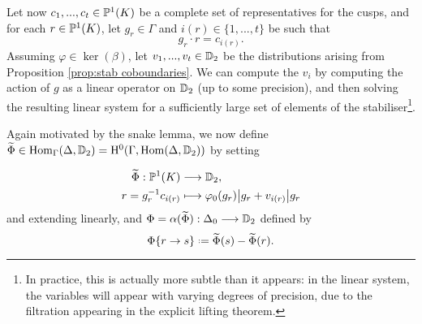 \documentclass[a4paper,11pt]{article}
\numberwithin{equation}{section}
\begin{document}
Let now $c_1, ..., c_t \in \mathbb{P}^1(K)$ be a complete set of representatives for the cusps, and for each $r \in \mathbb{P}^1(K)$, let $g_r \in \Gamma$ and $i(r) \in \{1,...,t\}$ be such that
\[
	g_r \cdot r = c_{i(r)}.
\]
Assuming $\varphi \in \ker(\beta)$, let $v_1, ..., v_t \in \mathbb{D}_2$ be the distributions arising from Proposition \ref{prop:stab coboundaries}. We can compute the $v_i$ by computing the action of $g$ as a linear operator on $\mathbb{D}_2$ (up to some precision), and then solving the resulting linear system for a sufficiently large set of elements of the stabiliser\footnote{In practice, this is actually more subtle than it appears: in the linear system, the variables will appear with varying degrees of precision, due to the filtration appearing in the explicit lifting theorem.}.

Again motivated by the snake lemma, we now define $\widetilde{\Phi} \in \mathrm{Hom}_\Gamma(\Delta,\mathbb{D}_2) = \mathrm{H}^0(\Gamma,\mathrm{Hom}(\Delta,\mathbb{D}_2))$ by setting

	\begin{align*}
		\widetilde{\Phi} : \mathbb{P}^1(K) &\longrightarrow \mathbb{D}_2,\\
				r = g_r^{-1}c_{i(r)} &\longmapsto \varphi_0(g_r)\big|g_r + v_{i(r)}\big|g_r
	\end{align*}
	and extending linearly, and $\Phi = \alpha(\widetilde{\Phi}) : \Delta_0 \longrightarrow \mathbb{D}_2$ defined by
	\[
		\Phi\{r\to s\} \defeq \widetilde{\Phi}(s) - \widetilde{\Phi}(r).
	\]



\end{document}
